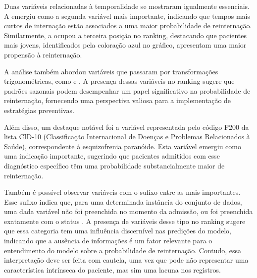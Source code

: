 Duas variáveis relacionadas à temporalidade se mostraram igualmente essenciais. A  emergiu como a segunda variável mais importante, indicando que tempos mais curtos de internação estão associados a uma maior probabilidade de reinternação. Similarmente, a  ocupou a terceira posição no ranking, destacando que pacientes mais jovens, identificados pela coloração azul no gráfico, apresentam uma maior propensão à reinternação.

A análise também abordou variáveis que passaram por transformações trigonométricas, como  e . A presença dessas variáveis no ranking sugere que padrões sazonais podem desempenhar um papel significativo na probabilidade de reinternação, fornecendo uma perspectiva valiosa para a implementação de estratégias preventivas.

Além disso, um destaque notável foi a variável representada pelo código F200 da lista CID-10 (Classificação Internacional de Doenças e Problemas Relacionados à Saúde), correspondente à esquizofrenia paranóide. Esta variável emergiu como uma indicação importante, sugerindo que pacientes admitidos com esse diagnóstico específico têm uma probabilidade substancialmente maior de reinternação.

Também é possível observar variáveis com o sufixo  entre as mais importantes. Esse sufixo indica que, para uma determinada instância do conjunto de dados, uma dada variável não foi preenchida no momento da admissão, ou foi preenchida exatamente com o status . A presença de variáveis desse tipo no ranking sugere que essa categoria tem uma influência discernível nas predições do modelo, indicando que a ausência de informações é um fator relevante para o entendimento do modelo sobre a probabilidade de reinternação. Contudo, essa interpretação deve ser feita com cautela, uma vez que pode não representar uma característica intrínseca do paciente, mas sim uma lacuna nos registros.